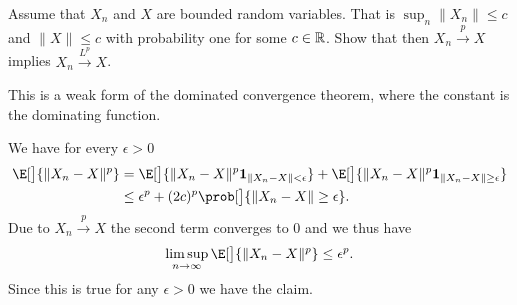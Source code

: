 
\begin{exercise}[subtitle={Stochastic convergence sometimes implies \(L^p\) \Coffeecup}]
    \label{ex: p to Lp when bounded}
    Assume that \(X_n\) and \(X\) are bounded random variables. That is 
    \(\sup_n\|X_n\| \le c\) and \(\|X\|\le c\) with probability one for some \(c
    \in \mathbb{R}\). Show that then \(X_n \overset{p}\to X\) implies \(X_n
    \overset{L^p}\to X\).
    \begin{remark}
        This is a weak form of the dominated convergence theorem, where the constant
        is the dominating function.
    \end{remark}
\end{exercise}
\begin{solution}
    We have for every \(\epsilon > 0\)
    \[\begin{aligned}
        \E[\big]{\norm{X_n - X}^p}
        &= \E[\big]{\norm{X_n - X}^p \ind{\norm{X_n - X} < \epsilon}}
        + \E[\big]{\norm{X_n - X}^p \ind{\norm{X_n - X} \ge \epsilon}}
        \\
        &\le \epsilon^p + (2c)^p \prob[\big]{\norm{X_n - X} \ge \epsilon}.
    \end{aligned}
    \]
    Due to \(X_n \overset{p}\to X\) the second term converges to \(0\)
    and we thus have
    \[
        \limsup_{n\to \infty} \E[\big]{\norm{X_n - X}^p} \le \epsilon^p.
    \]
    Since this is true for any \(\epsilon > 0\) we have the claim.
\end{solution}
